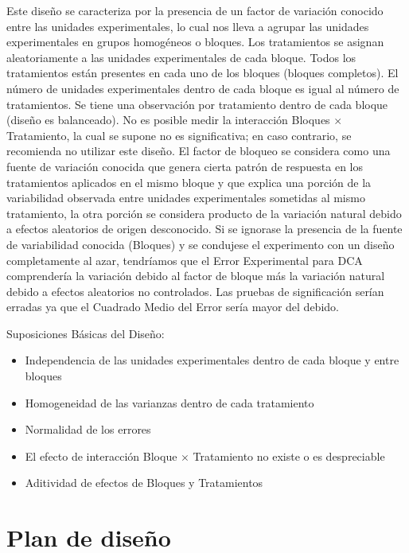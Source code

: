 \documentclass[]{book}
\providecommand{\tightlist}{%
  \setlength{\itemsep}{0pt}\setlength{\parskip}{0pt}}
\begin{document}
Este diseño se caracteriza por la presencia de un factor de variación
conocido entre las unidades experimentales, lo cual nos lleva a agrupar
las unidades experimentales en grupos homogéneos o bloques. Los
tratamientos se asignan aleatoriamente a las unidades experimentales de
cada bloque. Todos los tratamientos están presentes en cada uno de los
bloques (bloques completos). El número de unidades experimentales dentro
de cada bloque es igual al número de tratamientos. Se tiene una
observación por tratamiento dentro de cada bloque (diseño es
balanceado). No es posible medir la interacción Bloques \(\times\)
Tratamiento, la cual se supone no es significativa; en caso contrario,
se recomienda no utilizar este diseño. El factor de bloqueo se considera
como una fuente de variación conocida que genera cierta patrón de
respuesta en los tratamientos aplicados en el mismo bloque y que explica
una porción de la variabilidad observada entre unidades experimentales
sometidas al mismo tratamiento, la otra porción se considera producto de
la variación natural debido a efectos aleatorios de origen desconocido.
Si se ignorase la presencia de la fuente de variabilidad conocida
(Bloques) y se condujese el experimento con un diseño completamente al
azar, tendríamos que el Error Experimental para DCA comprendería la
variación debido al factor de bloque más la variación natural debido a
efectos aleatorios no controlados. Las pruebas de significación serían
erradas ya que el Cuadrado Medio del Error sería mayor del debido.

Suposiciones Básicas del Diseño:

\begin{itemize}
\tightlist
\item
  Independencia de las unidades experimentales dentro de cada bloque y
  entre bloques
\item
  Homogeneidad de las varianzas dentro de cada tratamiento
\item
  Normalidad de los errores
\item
  El efecto de interacción Bloque \(\times\) Tratamiento no existe o es
  despreciable
\item
  Aditividad de efectos de Bloques y Tratamientos
\end{itemize}

\section{Plan de diseño}\label{plan-de-diseno-1}
\end{document}

